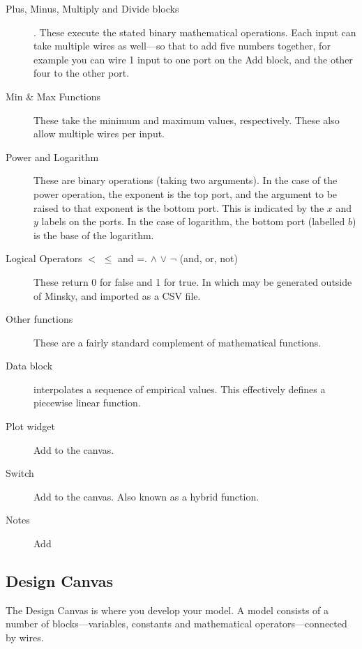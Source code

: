 \begin{description}
\item[Plus, Minus, Multiply and Divide blocks]
    . These execute the stated binary
    mathematical operations. Each input can take multiple wires as
    well---so that to add five numbers together, for example you can wire 1 input
    to one port on the Add block, and the other four to the other
    port. 

\item[Min \& Max Functions] These take the minimum and maximum values, respectively.
These also allow multiple wires per input.

\item[Power and Logarithm] These are binary operations (taking two
arguments). In the case of the power operation, the exponent is the
top port, and the argument to be raised to that exponent is the bottom
port. This is indicated by the $x$ and $y$ labels on the ports. In the
case of logarithm, the bottom port (labelled $b$) is the base of the
logarithm.

\item[Logical Operators $<$ $\le$ and =. $\wedge$ $\vee$ $\neg$ (and,
  or, not)] These return 0 for false and 1 for true.  In which may be
  generated outside of Minsky, and imported as a CSV file.

\item[Other functions] These are a fairly standard
complement of mathematical functions.

\item[Data block]  interpolates a
sequence of empirical values. This effectively defines a piecewise linear function.

\item[Plot widget] Add  to the canvas.

\item[Switch] Add  
to the canvas. Also known as a hybrid function.

\item[Notes] Add 

\end{description}

\subsection{Design Canvas}
\label{DesignCanvas}

The Design Canvas is where you develop your model. A model consists of
a number of blocks---variables, constants and mathematical
operators---connected by wires. 

